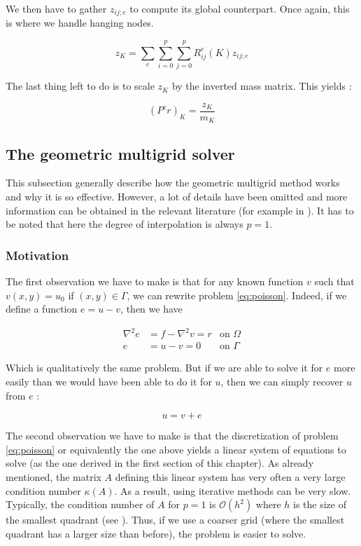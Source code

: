 We then have to gather $z_{ij;e}$ to compute its global counterpart. Once again, this is where we handle hanging nodes.

$$z_{K} = \sum_e\sum_{i=0}^p\sum_{j=0}^p R^e_{ij}(K)z_{ij;e}$$

The last thing left to do is to scale $z_K$ by the inverted mass matrix. This yields : 

$$(P^cr)_K = \frac{z_K}{m_K}$$

\subsection{The geometric multigrid solver}

This subsection generally describe how the geometric multigrid method works and why it is so effective. However, a lot of details have been omitted and more information can be obtained in the relevant literature (for example in \cite{multi_book}). It has to be noted that here the degree of interpolation is always $p=1$.

\subsubsection{Motivation}

The first observation we have to make is that for any known function $v$ such that $v(x,y)=u_0$ if $(x,y) \in \Gamma$, we can rewrite problem \ref{eq:poisson}. Indeed, if we define a function $e = u-v$, then we have

\begin{align}
\nabla ^2 e &= f-\nabla^2v = r &\text{on $\Omega$} \label{eq:poisson_error}\\
e &= u-v = 0 &\text{on $\Gamma$}
\end{align}

Which is qualitatively the same problem. But if we are able to solve it for $e$ more easily than we would have been able to do it for $u$, then we can simply recover $u$ from $e$ : 

$$u = v + e$$

The second observation we have to make is that the discretization of problem \ref{eq:poisson} or equivalently the one above yields a linear system of equations to solve (as the one derived in the first section of this chapter). As already mentioned, the matrix $A$ defining this linear system has very often a very large condition number $\kappa(A)$. As a result, using iterative methods can be very slow. Typically, the condition number of $A$ for $p=1$ is $\mathcal{O}(h^2)$ where $h$ is the size of the smallest quadrant (see \cite{condNumb}). Thus, if we use a coarser grid (where the smallest quadrant has a larger size than before), the problem is easier to solve. 

